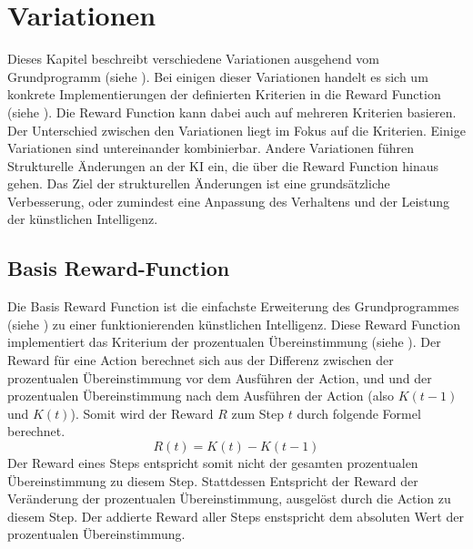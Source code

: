 \section{Variationen}\label{chap:m_var}
Dieses Kapitel beschreibt verschiedene Variationen ausgehend vom Grundprogramm
(siehe ). Bei einigen dieser Variationen handelt es sich
um konkrete Implementierungen der definierten Kriterien in die Reward Function
(siehe ). Die Reward Function kann dabei auch auf
mehreren Kriterien basieren. Der Unterschied zwischen den Variationen liegt im
Fokus auf die Kriterien. Einige Variationen sind untereinander kombinierbar.
Andere Variationen führen Strukturelle Änderungen an der KI ein, die über die
Reward Function hinaus gehen. Das Ziel der strukturellen Änderungen ist eine
grundsätzliche Verbesserung, oder zumindest eine Anpassung des Verhaltens und
der Leistung der künstlichen Intelligenz. 

\subsection{Basis Reward-Function}\label{sub:m_var_base}
Die Basis Reward Function ist die einfachste Erweiterung des Grundprogrammes
(siehe ) zu einer funktionierenden künstlichen
Intelligenz. Diese Reward Function implementiert das Kriterium der prozentualen
Übereinstimmung (siehe ). Der Reward für eine Action
berechnet sich aus der Differenz zwischen der prozentualen Übereinstimmung vor
dem Ausführen der Action, und und der prozentualen Übereinstimmung nach dem
Ausführen der Action (also $K(t-1)$ und $K(t)$). Somit wird der Reward $R$ zum
Step $t$ durch folgende Formel berechnet. 
\[ R(t) = K(t) - K(t-1) \]
Der Reward eines Steps entspricht somit nicht der gesamten prozentualen
Übereinstimmung zu diesem Step. Stattdessen Entspricht der Reward der
Veränderung der prozentualen Übereinstimmung, ausgelöst durch die Action zu diesem
Step. Der addierte Reward aller Steps enstspricht dem absoluten Wert der
prozentualen Übereinstimmung.


